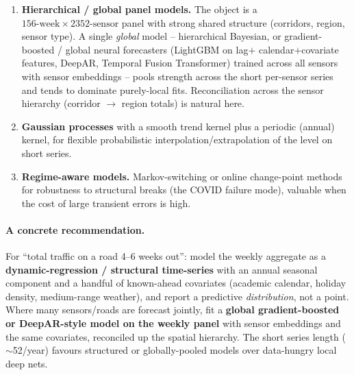 \documentclass[11pt]{article}
\begin{document}
\begin{enumerate}
  short, localized events wash out of the weekly-network aggregate and pay off only
  at the sensor/corridor level near the venue or closure.
\item \textbf{Hierarchical / global panel models.} The object is a
  $156\text{-week}\times2352\text{-sensor}$ panel with strong shared structure
  (corridors, region, sensor type). A single \emph{global} model -- hierarchical
  Bayesian, or gradient-boosted / global neural forecasters (LightGBM on lag$+$
  calendar$+$covariate features, DeepAR, Temporal Fusion Transformer) trained
  across all sensors with sensor embeddings -- pools strength across the short
  per-sensor series and tends to dominate purely-local fits. Reconciliation across
  the sensor hierarchy (corridor $\to$ region totals) is natural here.
\item \textbf{Gaussian processes} with a smooth trend kernel plus a periodic
  (annual) kernel, for flexible probabilistic interpolation/extrapolation of the
  level on short series.
\item \textbf{Regime-aware models.} Markov-switching or online change-point methods
  for robustness to structural breaks (the COVID failure mode), valuable when the
  cost of large transient errors is high.
\end{enumerate}

\paragraph{A concrete recommendation.} For ``total traffic on a road 4--6 weeks
out'': model the weekly aggregate as a \textbf{dynamic-regression / structural
time-series} with an annual seasonal component and a handful of known-ahead
covariates (academic calendar, holiday density, medium-range weather), and report
a predictive \emph{distribution}, not a point. Where many sensors/roads are
forecast jointly, fit a \textbf{global gradient-boosted or DeepAR-style model on
the weekly panel} with sensor embeddings and the same covariates, reconciled up the
spatial hierarchy. The short series length ($\sim$52/year) favours structured or
globally-pooled models over data-hungry local deep nets.
\end{document}
